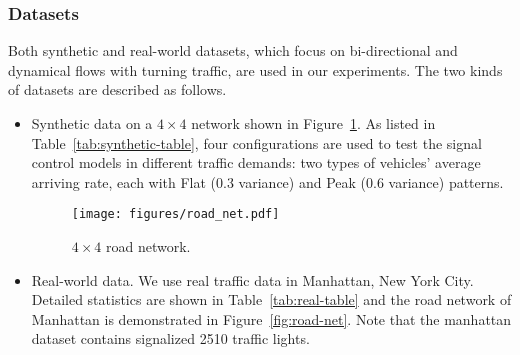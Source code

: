 \subsubsection{Datasets}
Both synthetic and real-world datasets, which focus on bi-directional and dynamical flows with turning traffic, are used in our experiments. The two kinds of datasets are described as follows.
\begin{itemize}[wide,noitemsep,topsep=0pt]
\item Synthetic data on a $4\times4$ network shown in Figure~\ref{fig:net}. As listed in Table~\ref{tab:synthetic-table}, four configurations are used to test the signal control models in different traffic demands: two types of vehicles' average arriving rate, each with Flat (0.3 variance) and Peak (0.6 variance) patterns. 



\begin{figure}[htbp]
\centering
\texttt{[image: figures/road\_net.pdf]} \vspace{-2mm}
\caption{$4\times4$ road network.}\vspace{-2mm}
\label{fig:net}
\end{figure}

\item Real-world data. We use real traffic data in Manhattan, New York City. Detailed statistics are shown in Table~\ref{tab:real-table} and the road network of Manhattan is demonstrated in Figure~\ref{fig:road-net}. Note that the manhattan dataset contains signalized 2510 traffic lights.\\


\end{itemize}
